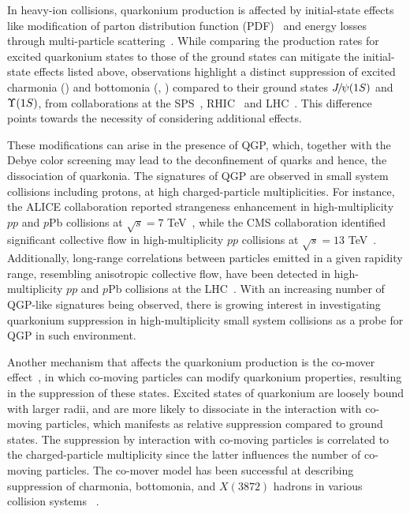 \documentclass[12pt,a4paper]{article}
\begin{document}
In heavy-ion collisions, quarkonium production is affected by initial-state effects like modification of parton distribution function (PDF)~\cite{AtashbarTehrani:2017mzi} and energy losses through multi-particle scattering~\cite{Arleo:2014oha}. While comparing the production rates for excited quarkonium states to those of the ground states can mitigate the initial-state effects listed above, observations highlight a distinct suppression of excited charmonia (\psitwos) and bottomonia (\TwoS, \ThreeS) compared to their ground states ${{J\mskip -3mu/\mskip -2mu\psi}}(1S)$ and $\OneS$, from collaborations at the SPS~\cite{NA50:2006yzz}, RHIC~\cite{PHENIX:2022nrm} and LHC~\cite{LHCb:2018psc,ALICE:2020vjy, LHCb:2016vqr,CMS:2022wfi,ATLAS:2017prf}. This difference points towards the necessity of considering additional effects.

These modifications can arise in the presence of QGP, which, together with the Debye color screening may lead to the deconfinement of quarks and hence, the dissociation of quarkonia. The signatures of QGP are observed in small system collisions including protons, at high charged-particle multiplicities. For instance, the ALICE collaboration reported strangeness enhancement in high-multiplicity $pp$ and $p$Pb collisions at $\sqrt{s}=7$ TeV~\cite{ALICE:2016fzo}, while the CMS collaboration identified significant collective flow in high-multiplicity $pp$ collisions at $\sqrt{s}=13$ TeV~\cite{CMS:2016fnw}. Additionally, long-range correlations between particles emitted in a given rapidity range, resembling anisotropic collective flow, have been detected in high-multiplicity $pp$ and $p$Pb collisions at the LHC~\cite{ALICE:2012eyl,ATLAS:2012cix,CMS:2012qk,CMS:2010ifv}. With an increasing number of QGP-like signatures being observed, there is growing interest in investigating quarkonium suppression in high-multiplicity small system collisions as a probe for QGP in such environment.

Another mechanism that affects the quarkonium production is the co-mover effect~\cite{Ferreiro:2012rq}, in which co-moving particles can modify quarkonium properties, resulting in the suppression of these states. Excited states of quarkonium are loosely bound with larger radii, and are more likely to dissociate in the interaction with co-moving particles, which manifests as relative suppression compared to ground states. The suppression by interaction with co-moving particles is correlated to the charged-particle multiplicity since the latter influences the number of co-moving particles. The co-mover model has been successful at describing suppression of charmonia, bottomonia, and $X(3872)$ hadrons in various collision systems ~\cite{Gavin:1996yd,Ferreiro:2018wbd,Esposito:2020ywk,Braaten:2020iqw}. 
\end{document}
